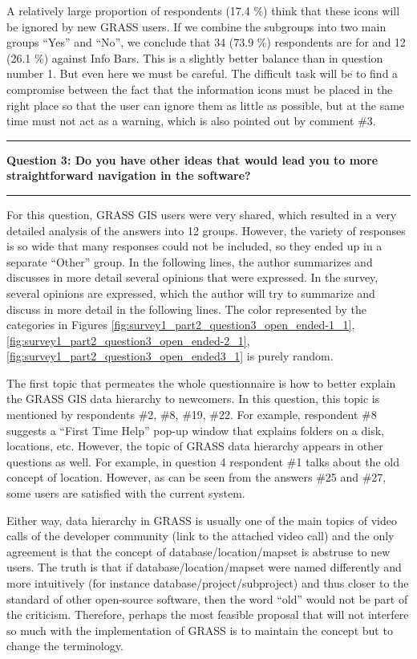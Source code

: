 \documentclass[a4paper,10pt,twoside]{article}
\begin{document}
\noindent A relatively large proportion of respondents (17.4 \%) think that these icons will be ignored by new GRASS users. If we combine the subgroups into two main groups ``Yes'' and ``No'', we conclude that 34 (73.9 \%) respondents are for and 12 (26.1 \%) against Info Bars. This is a slightly better balance than in question number 1. But even here we must be careful. The difficult task will be to find a compromise between the fact that the information icons must be placed in the right place so that the user can ignore them as little as possible, but at the same time must not act as a warning, which is also pointed out by comment \#3.

\par\noindent\rule{\textwidth}{0.4pt}
\noindent \textbf{Question 3: Do you have other ideas that would lead you to more straightforward navigation in the software?}
\par\noindent\rule{\textwidth}{0.4pt}
\noindent For this question, GRASS GIS users were very shared, which resulted in a very detailed analysis of the answers into 12 groups. However, the variety of responses is so wide that many responses could not be included, so they ended up in a separate ``Other'' group. In the following lines, the author summarizes and discusses in more detail several opinions that were expressed. In the survey, several opinions are expressed, which the author will try to summarize and discuss in more detail in the following lines. The color represented by the categories in Figures \ref{fig:survey1_part2_question3_open_ended-1_1}, \ref{fig:survey1_part2_question3_open_ended-2_1}, \ref{fig:survey1_part2_question3_open_ended3_1} is purely random.

The first topic that permeates the whole questionnaire is how to better explain the GRASS GIS data hierarchy to newcomers. In this question, this topic is mentioned by respondents \#2, \#8, \#19, \#22. For example, respondent \#8 suggests a ``First Time Help'' pop-up window that explains folders on a disk, locations, etc. However, the topic of GRASS data hierarchy appears in other questions as well. For example, in question 4 respondent \#1 talks about the old concept of location. However, as can be seen from the answers \#25 and \#27, some users are satisfied with the current system.

Either way, data hierarchy in GRASS is usually one of the main topics of video calls of the developer community (link to the attached video call) and the only agreement is that the concept of database/location/mapset is abstruse to new users. The truth is that if database/location/mapset were named differently and more intuitively (for instance database/project/subproject) and thus closer to the standard of other open-source software, then the word ``old'' would not be part of the criticism. Therefore, perhaps the most feasible proposal that will not interfere so much with the implementation of GRASS is to maintain the concept but to change the terminology.
\end{document}

